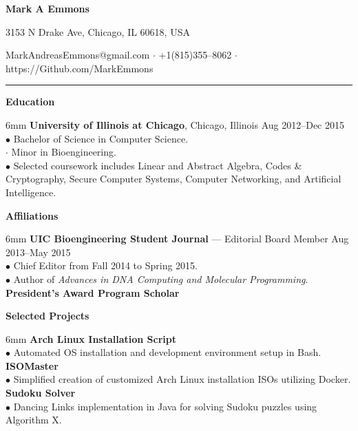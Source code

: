 \documentclass[11pt]{article}
\newcommand{\sectionheader}[1]{\noindent \textbf{\large #1}}
\newenvironment{sectionbody}{\begin{adjustwidth}{6mm}{}}{\end{adjustwidth}}
\begin{document}

\centerline{\LARGE \bf Mark A Emmons}
\centerline{3153 N Drake Ave, Chicago, IL 60618, USA}
\centerline{MarkAndreasEmmons@gmail.com $\cdot$ +1(815)355--8062 $\cdot$ https://Github.com/MarkEmmons}

\noindent\rule{16.5cm}{0.4pt}

\sectionheader{Education}
\begin{sectionbody}
{\bf University of Illinois at Chicago}, Chicago, Illinois \hfill Aug 2012--Dec 2015 \\
$\bullet$ Bachelor of Science in Computer Science. \\
\indent $\cdot$ Minor in Bioengineering. \\
$\bullet$ Selected coursework includes Linear and Abstract Algebra, Codes \& Cryptography, Secure Computer Systems, Computer Networking, and Artificial Intelligence.
\end{sectionbody}

\vspace{2mm}

\sectionheader{Affiliations}
\begin{sectionbody}
{\bf UIC Bioengineering Student Journal} --- Editorial Board Member \hfill Aug 2013--May 2015 \\
$\bullet$ Chief Editor from Fall 2014 to Spring 2015. \\
$\bullet$ Author of {\it Advances in DNA Computing and Molecular Programming}. \\
{\bf President's Award Program Scholar}
\end{sectionbody}

\vspace{2mm}

\sectionheader{Selected Projects}
\begin{sectionbody}
{\bf Arch Linux Installation Script} \\
$\bullet$ Automated OS installation and development environment setup in Bash. \\
{\bf ISOMaster} \\
$\bullet$ Simplified creation of customized Arch Linux installation ISOs utilizing Docker. \\
{\bf Sudoku Solver} \\
$\bullet$ Dancing Links implementation in Java for solving Sudoku puzzles using Algorithm X.
\end{sectionbody}
\end{document}
